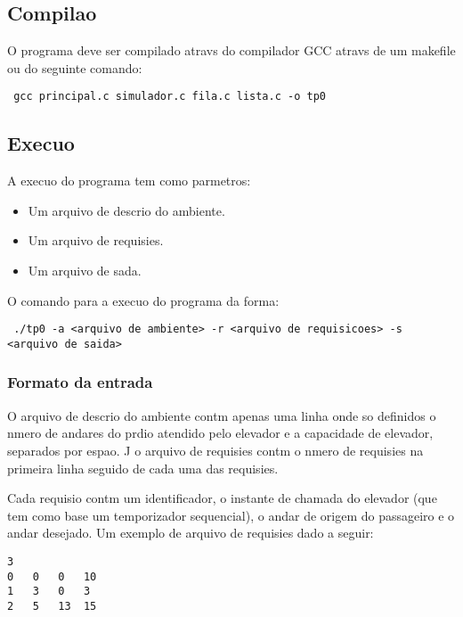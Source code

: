 \documentclass[12pt]{article}
\begin{document}
\subsection{Compilao}

O programa deve ser compilado atravs do compilador GCC atravs de um makefile ou do seguinte comando:

\begin{footnotesize}
\begin{verbatim} gcc principal.c simulador.c fila.c lista.c -o tp0 \end{verbatim}
\end{footnotesize}

\subsection{Execuo}

A execuo do programa tem como parmetros:
\begin{itemize}
\item Um arquivo de descrio do ambiente.
\item Um arquivo de requisies.
\item Um arquivo de sada.
\end{itemize}

O comando para a execuo do programa  da forma:

\begin{footnotesize}
\begin{verbatim} ./tp0 -a <arquivo de ambiente> -r <arquivo de requisicoes> -s <arquivo de saida> \end{verbatim}
\end{footnotesize}

\subsubsection{Formato da entrada}

O arquivo de descrio do ambiente contm apenas uma linha onde so definidos o nmero de andares do prdio atendido pelo elevador e a capacidade de elevador, separados por espao. J o arquivo de requisies contm o nmero de requisies na primeira linha seguido de cada uma das requisies.

Cada requisio contm um identificador, o instante de chamada do elevador (que tem como base um temporizador sequencial), o andar de origem do passageiro e o andar desejado. Um exemplo de arquivo de requisies  dado a seguir:

\begin{footnotesize}
\begin{verbatim}
3
0	0	0	10
1	3	0	3
2	5	13	15
\end{verbatim}
\end{footnotesize}
\end{document}
